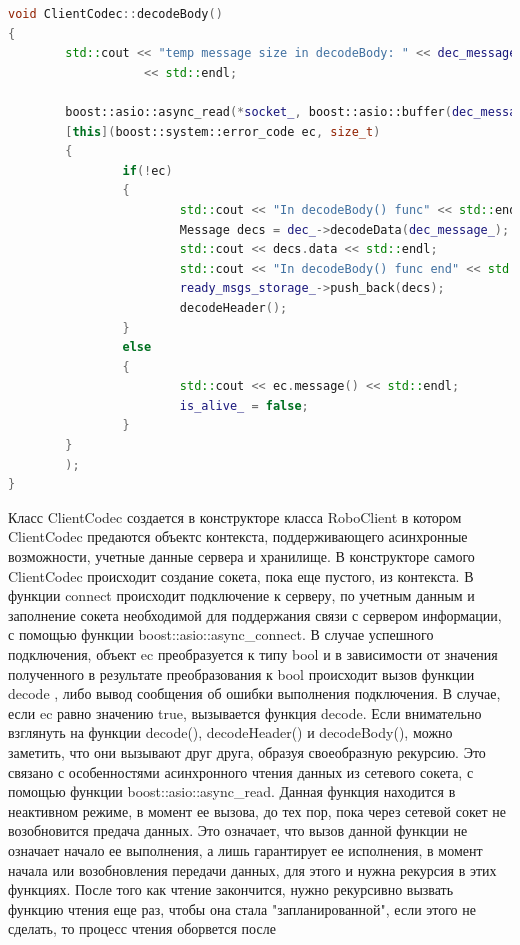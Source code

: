 \documentclass[a4paper, 14pt]{extreport}
\begin{document}
\begin{lstlisting}[language=C++, frame=single, xleftmargin=15pt, caption={Определение методов класса ClientCodec},label=DescriptiveLabel]
void ClientCodec::decodeBody()
{
        std::cout << "temp message size in decodeBody: " << dec_message_.getDataLength()
                   << std::endl;

        boost::asio::async_read(*socket_, boost::asio::buffer(dec_message_.getData(), dec_message_.getDataLength() - 1),
        [this](boost::system::error_code ec, size_t)
        {
                if(!ec)
                {
                        std::cout << "In decodeBody() func" << std::endl;
                        Message decs = dec_->decodeData(dec_message_); 
                        std::cout << decs.data << std::endl;
                        std::cout << "In decodeBody() func end" << std::endl;
                        ready_msgs_storage_->push_back(decs);
                        decodeHeader();
                }
                else
                {
                        std::cout << ec.message() << std::endl;
                        is_alive_ = false;
                }
        }
        );
}
\end{lstlisting}
\par Класс ClientCodec создается в конструкторе класса RoboClient в котором ClientCodec предаются объектс контекста, поддерживающего 
асинхронные возможности, учетные данные сервера и хранилище. В конструкторе самого ClientCodec происходит создание сокета, пока еще 
пустого, из контекста. В функции connect происходит подключение к серверу, по учетным данным и заполнение сокета необходимой для
поддержания связи с сервером информации, с помощью функции boost::asio::async\_connect. В случае успешного подключения, объект ec 
преобразуется к типу bool и в зависимости от значения полученного в результате преобразования к bool происходит вызов функции decode 
, либо вывод сообщения об ошибки выполнения подключения. В случае, если ec равно значению true, вызывается функция decode. Если 
внимательно взглянуть на функции decode(), decodeHeader() и decodeBody(), можно заметить, что они вызывают друг друга, образуя 
своеобразную рекурсию. Это связано с особенностями асинхронного чтения данных из сетевого сокета, с помощью функции 
boost::asio::async\_read. Данная функция находится в неактивном режиме, в момент ее вызова, до тех пор, пока через сетевой сокет не 
возобновится предача данных. Это означает, что вызов данной функции не означает начало ее выполнения, а лишь гарантирует ее исполнения, 
в момент начала или возобновления передачи данных, для этого и нужна рекурсия в этих функциях. После того как чтение закончится, нужно 
рекурсивно вызвать функцию чтения еще раз, чтобы она стала "запланированной", если этого не сделать, то процесс чтения оборвется после 
\end{document}
